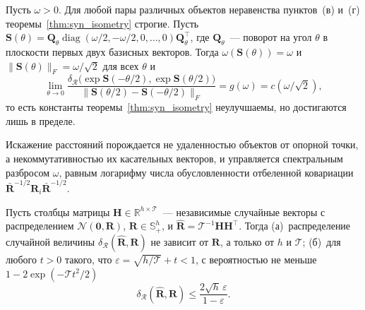 \begin{proposition}\label{prop:syn_sharp}
Пусть $\omega > 0$. Для любой пары различных объектов неравенства пунктов~(в) и~(г) теоремы~\ref{thm:syn_isometry} строгие. Пусть $\mathbf{S}(\theta) = \mathbf{Q}_{\theta} \operatorname{diag}(\omega/2, -\omega/2, 0, \ldots, 0) \mathbf{Q}_{\theta}^{\top}$, где $\mathbf{Q}_{\theta}$~--- поворот на угол $\theta$ в плоскости первых двух базисных векторов. Тогда $\omega(\mathbf{S}(\theta)) = \omega$ и $\|\mathbf{S}(\theta)\|_F = \omega/\sqrt{2}$ для всех $\theta$ и
\begin{equation*}
\lim_{\theta \to 0} \frac{\delta_{\mathcal{R}}\big(\exp \mathbf{S}(-\theta/2), \exp \mathbf{S}(\theta/2)\big)}{\|\mathbf{S}(\theta/2) - \mathbf{S}(-\theta/2)\|_F} = g(\omega) = c(\omega/\sqrt{2}),
\end{equation*}
то есть константы теоремы~\ref{thm:syn_isometry} неулучшаемы, но достигаются лишь в пределе.
\end{proposition}

Искажение расстояний порождается не удаленностью объектов от опорной точки, а некоммутативностью их касательных векторов, и управляется спектральным разбросом $\omega$, равным логарифму числа обусловленности отбеленной ковариации $\bar{\mathbf{R}}^{-1/2}\mathbf{R}_i\bar{\mathbf{R}}^{-1/2}$.

\begin{theorem}\label{thm:syn_conc}
Пусть столбцы матрицы $\mathbf{H} \in \mathbb{R}^{h \times \mathcal{T}}$~--- независимые случайные векторы с распределением $\mathcal{N}(\mathbf{0}, \mathbf{R})$, $\mathbf{R} \in \mathbb{S}_{+}^{h}$, и $\hat{\mathbf{R}} = \mathcal{T}^{-1}\mathbf{H}\mathbf{H}^{\top}$. Тогда (а)~распределение случайной величины $\delta_{\mathcal{R}}(\hat{\mathbf{R}}, \mathbf{R})$ не зависит от $\mathbf{R}$, а только от $h$ и $\mathcal{T}$; (б)~для любого $t > 0$ такого, что $\varepsilon = \sqrt{h/\mathcal{T}} + t < 1$, с вероятностью не меньше $1 - 2\exp(-\mathcal{T}t^2/2)$
\begin{equation*}
\delta_{\mathcal{R}}(\hat{\mathbf{R}}, \mathbf{R}) \leqslant \frac{2\sqrt{h}\,\varepsilon}{1 - \varepsilon}.
\end{equation*}
\end{theorem}

